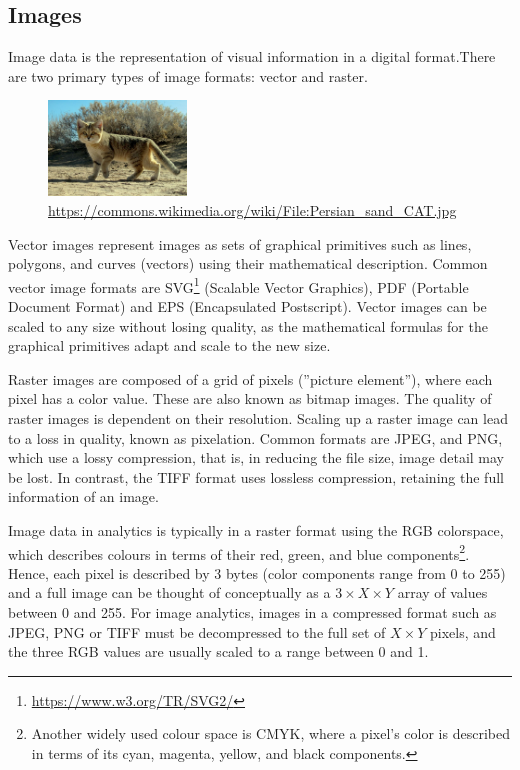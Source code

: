 \subsection*{Images}

Image data is the representation of visual information in a digital format.There are two primary types of image formats: vector and raster. 

\begin{figure}
\begin{center}
\includegraphics[height=1in]{Persian_sand_CAT.jpg}
\scriptsize\url{https://commons.wikimedia.org/wiki/File:Persian_sand_CAT.jpg}
\end{center}
\end{figure}

Vector images represent images as sets of graphical primitives such as lines, polygons, and curves (vectors) using their mathematical description. Common vector image formats are SVG\footnote{\url{https://www.w3.org/TR/SVG2/}} (Scalable Vector Graphics), PDF (Portable Document Format) and EPS (Encapsulated Postscript). Vector images can be scaled to any size without losing quality, as the mathematical formulas for the graphical primitives adapt and scale to the new size.

Raster images are composed of a grid of pixels (''picture element''), where each pixel has a color value. These are also known as bitmap images. The quality of raster images is dependent on their resolution. Scaling up a raster image can lead to a loss in quality, known as pixelation. Common formats are JPEG, and PNG, which use a lossy compression, that is, in reducing the file size, image detail may be lost. In contrast, the TIFF format uses lossless compression, retaining the full information of an image. 

Image data in analytics is typically in a raster format using the RGB colorspace, which describes colours in terms of their red, green, and blue components\footnote{Another widely used colour space is CMYK, where a pixel's color is described in terms of its cyan, magenta, yellow, and black components.}. Hence, each pixel is described by 3 bytes (color components range from 0 to 255) and a full image can be thought of conceptually as  a $3 \times X \times Y$ array of values between 0 and 255. For image analytics, images in a compressed format such as JPEG, PNG or TIFF must be decompressed to the full set of $X \times Y$ pixels, and the three RGB values are usually scaled to a range between 0 and 1.

